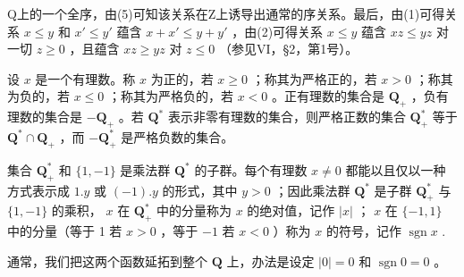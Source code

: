 Q上的一个全序，由(5)可知该关系在Z上诱导出通常的序关系。最后，由(1)可得关系 \(x \leqslant y\) 和 \(x' \leqslant y'\) 蕴含 \(x + x' \leqslant y + y'\) ，由(2)可得关系 \(x \leqslant y\) 蕴含 \(xz \leqslant yz\) 对一切 \(z \geqslant 0\) ，且蕴含 \(xz \geqslant yz\) 对 \(z \leqslant 0\) （参见VI，§2，第1号）。

设 \(x\) 是一个有理数。称 \(x\) 为正的，若 \(x \geqslant 0\) ；称其为严格正的，若 \(x > 0\) ；称其为负的，若 \(x \leqslant 0\) ；称其为严格负的，若 \(x < 0\) 。正有理数的集合是 \(\mathbf{Q}_{+}\) ，负有理数的集合是 \(-\mathbf{Q}_{+}\) 。若 \(\mathbf{Q}^{*}\) 表示非零有理数的集合，则严格正数的集合 \(\mathbf{Q}_{+}^{*}\) 等于 \(\mathbf{Q}^{*} \cap \mathbf{Q}_{+}\) ，而 \(-\mathbf{Q}_{+}^{*}\) 是严格负数的集合。

集合 \(\mathbf{Q}_{+}^{*}\) 和 \(\{1, -1\}\) 是乘法群 \(\mathbf{Q}^{*}\) 的子群。每个有理数 \(x \neq 0\) 都能以且仅以一种方式表示成 \(1.y\) 或 \((-1).y\) 的形式，其中 \(y > 0\) ；因此乘法群 \(\mathbf{Q}^{*}\) 是子群 \(\mathbf{Q}_{+}^{*}\) 与 \(\{1, -1\}\) 的乘积， \(x\) 在 \(\mathbf{Q}_{+}^{*}\) 中的分量称为 \(x\) 的绝对值，记作 \(|x|\) ； \(x\) 在 \(\{-1, 1\}\) 中的分量（等于 1 若 \(x > 0\) ，等于 \(-1\) 若 \(x < 0\) ）称为 \(x\) 的符号，记作 \(\operatorname{sgn} x\) .

通常，我们把这两个函数延拓到整个 \(\mathbf{Q}\) 上，办法是设定 \(|0| = 0\) 和 \(\operatorname{sgn} 0 = 0\) 。

